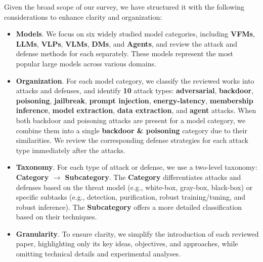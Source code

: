 


Given the broad scope of our survey, we have structured it with the following considerations to enhance clarity and organization:
\begin{itemize}
    \item \textbf{Models}. We focus on six widely studied model categories, including \textbf{VFMs}, \textbf{LLMs}, \textbf{VLPs}, \textbf{VLMs}, \textbf{DMs}, and \textbf{Agents}, and review the attack and defense methods for each separately. These models represent the most popular large models across various domains.
    
    \item \textbf{Organization}. For each model category, we classify the reviewed works into attacks and defenses, and identify \textbf{10} attack types: \textbf{adversarial}, \textbf{backdoor}, \textbf{poisoning}, \textbf{jailbreak}, \textbf{prompt injection}, \textbf{energy-latency}, \textbf{membership inference}, \textbf{model extraction}, \textbf{data extraction}, and \textbf{agent} attacks. When both backdoor and poisoning attacks are present for a model category, we combine them into a single \textbf{backdoor \& poisoning} category due to their similarities. We review the corresponding defense strategies for each attack type immediately after the attacks.

    \item \textbf{Taxonomy}. For each type of attack or defense, we use a two-level taxonomy: \textbf{Category $\rightarrow$ Subcategory}. The \textbf{Category} differentiates attacks and defenses based on the threat model (e.g., white-box, gray-box, black-box) or specific subtasks (e.g., detection, purification, robust training/tuning, and robust inference). The \textbf{Subcategory} offers a more detailed classification based on their techniques.
    
    \item \textbf{Granularity}. To ensure clarity, we simplify the introduction of each reviewed paper, highlighting only its key ideas, objectives, and approaches, while omitting technical details and experimental analyses. 
    
\end{itemize}

